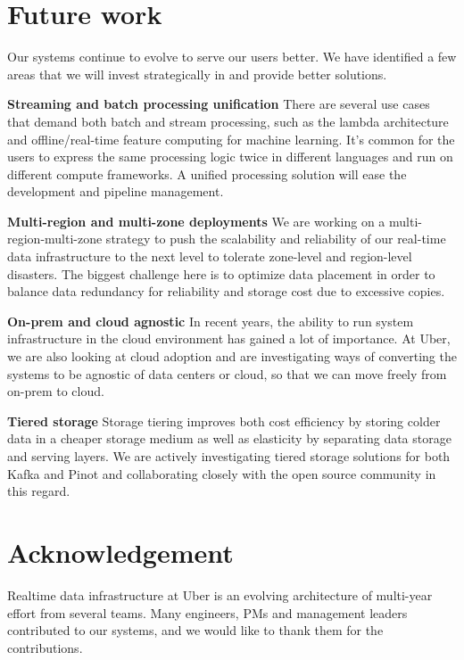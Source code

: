 \documentclass[sigconf]{acmart}
\begin{document}
\section{Future work} \label{sec:future}
Our systems continue to evolve to serve our users better. We have identified a few areas that we will invest strategically in and provide better solutions.

{\bfseries Streaming and batch processing unification} There are several use cases that demand both batch and stream processing, such as the lambda architecture and offline/real-time feature computing for machine learning. It’s common for the users to express the same processing logic twice in different languages and run on different compute frameworks. A unified processing solution will ease the development and pipeline management. 

{\bfseries Multi-region and multi-zone deployments} We are working on a multi-region-multi-zone strategy to push the scalability and reliability of our real-time data infrastructure to the next level to tolerate zone-level and region-level disasters. The biggest challenge here is to optimize data placement in order to balance data redundancy for reliability and storage cost due to excessive copies.

{\bfseries On-prem and cloud agnostic} In recent years, the ability to run system infrastructure in the cloud environment has gained a lot of importance. At Uber, we are also looking at cloud adoption and are investigating ways of converting the systems to be agnostic of data centers or cloud, so that we can move freely from on-prem to cloud.

{\bfseries Tiered storage} Storage tiering improves both cost efficiency by storing colder data in a cheaper storage medium as well as elasticity by separating data storage and serving layers. We are actively investigating tiered storage solutions for both Kafka and Pinot and collaborating closely with the open source community in this regard.

\section{Acknowledgement}
Realtime data infrastructure at Uber is an evolving architecture of multi-year effort from several teams. Many engineers, PMs and management leaders contributed to our systems, and we would like to thank them for the contributions. 



\end{document}
